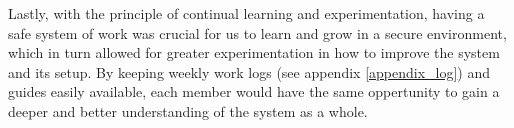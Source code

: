 Lastly, with the principle of continual learning and experimentation, having a safe system of work\cite{devopshandbook} was crucial for us to learn and grow in a secure environment, which in turn allowed for greater experimentation in how to improve the system and its setup. By keeping weekly work logs (see appendix \ref{appendix_log}) and guides easily available, each member would have the same oppertunity to gain a deeper and better understanding of the system as a whole.

